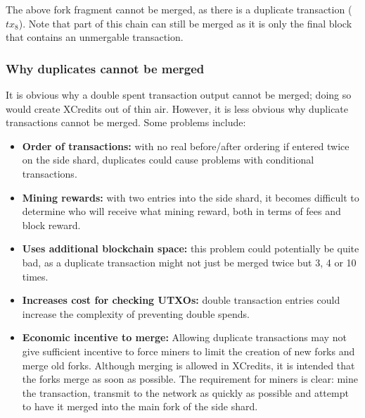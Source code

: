 \documentclass[a4paper,12pt]{article}
\begin{document}
The above fork fragment cannot be merged, as there is a duplicate transaction ($tx_8$). Note that part of this chain can still be merged as it is only the final block that contains an unmergable transaction. 

\subsubsection{Why duplicates cannot be merged}
It is obvious why a double spent transaction output cannot be merged; doing so would create XCredits out of thin air. However, it is less obvious why duplicate transactions cannot be merged. Some problems include:

\begin{itemize}
  \item \textbf{Order of transactions:} with no real before/after ordering if entered twice on the side shard, duplicates could cause problems with conditional transactions.

  \item \textbf{Mining rewards:} with two entries into the side shard, it becomes difficult to determine who will receive what mining reward, both in terms of fees and block reward. 

  \item \textbf{Uses additional blockchain space:} this problem could potentially be quite bad, as a duplicate transaction might not just be merged twice but 3, 4 or 10 times. 

  \item \textbf{Increases cost for checking UTXOs:} double transaction entries could increase the complexity of preventing double spends. 

  \item \textbf{Economic incentive to merge:} Allowing duplicate transactions may not give sufficient incentive to force miners to limit the creation of new forks and merge old forks. Although merging is allowed in XCredits, it is intended that the forks merge as soon as possible. The requirement for miners is clear: mine the transaction, transmit to the network as quickly as possible and attempt to have it merged into the main fork of the side shard. 
\end{itemize}
\end{document}
